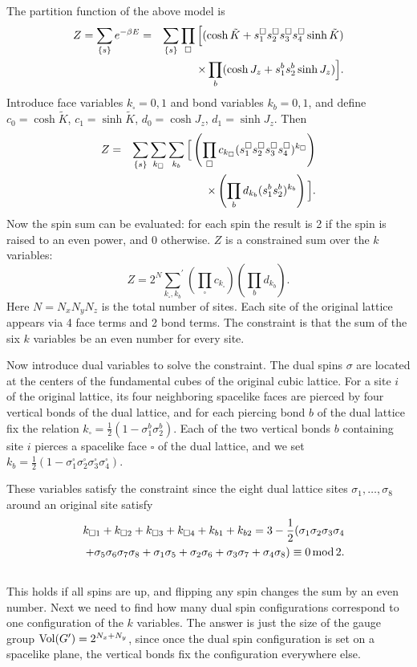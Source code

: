 \documentclass[prl,twocolumn,showpacs,superscriptaddress,preprintnumbers,amssymb]{revtex4}
\def\vol{{\rm Vol}}
\newcommand{\beq}{\begin{equation}}
\newcommand{\eeq}{\end{equation}}
\newcommand{\beqn}{\begin{eqnarray}}
\newcommand{\eeqn}{\end{eqnarray}}
\begin{document}
The partition function of the above model is \beqn Z =
\sum_{\{s\}} e^{-\beta E} &=& \sum_{\{s\}} \prod_\square
\Big[(\cosh {\tilde K} + s^\square_1 s^\square_2 s^\square_3
s^\square_4 \sinh {\tilde K})\cr &&\times \prod_b (\cosh J_z +
s^b_1 s^b_2 \sinh J_z)\Big]. \eeqn Introduce face variables
$k_\square = 0,1$ and bond variables $k_b = 0, 1$, and define $c_0
= \cosh {\tilde K}$, $c_1 = \sinh {\tilde K}$, $d_0 = \cosh J_z$,
$d_1 = \sinh J_z$.  Then
\beqn Z &=& \sum_{\{s\}} \sum_{k_\square}
\sum_{k_b}  \Big[ \left( \prod_{\square}  c_{k_\square}
(s^\square_1 s^\square_2 s^\square_3 s^\square_4)^{k_\square}
\right) \cr && \times \left( \prod_b d_{k_b} (s^b_1
s^b_2)^{k_b}\right)\Big]. \eeqn
Now the spin sum can be evaluated:
for each spin the result is 2 if the spin is raised to an even
power, and 0 otherwise.  $Z$ is a constrained sum over the $k$
variables: \beq Z = 2^N {\sum_{k_\square,k_b}}^\prime \left(
\prod_{\square} c_{k_\square} \right) \left(\prod_b d_{k_b}
\right). \eeq Here $N=N_x N_y N_z$ is the total number of sites.
Each site of the original lattice appears via 4
face terms and 2 bond terms.  The constraint is that the sum of
the six $k$ variables be an even number for every site.

Now introduce dual variables to solve the constraint.  The dual
spins $\sigma$ are located at the centers of the fundamental cubes
of the original cubic lattice.  For a site $i$ of the original
lattice, its four neighboring spacelike faces are pierced by four
vertical bonds of the dual lattice, and for each piercing bond $b$
of the dual lattice fix the relation $k_\square = \frac{1}{2}(1 -
\sigma^b_1 \sigma^b_2)$.  Each of the two vertical bonds $b$
containing site $i$ pierces a spacelike face $\square$ of the dual
lattice, and we set $k_b = \frac{1}{2}(1 - \sigma^\square_1
\sigma^\square_2 \sigma^\square_3 \sigma^\square_4).$

These variables satisfy the constraint since the eight
dual lattice sites $\sigma_1,\ldots,\sigma_8$ around an original site satisfy
\beqn && k_{\square 1} + k_{\square 2}
+ k_{\square 3} + k_{\square 4} + k_{b 1} + k_{b 2} = 3 -
\frac{1}{2}(\sigma_1 \sigma_2 \sigma_3 \sigma_4 \cr&&+ \sigma_5
\sigma_6 \sigma_7 \sigma_8 + \sigma_1 \sigma_5 + \sigma_2 \sigma_6
+ \sigma_3 \sigma_7 + \sigma_4 \sigma_8) \equiv
0\,\rm{mod}\,2.\cr&& \eeqn This holds if all spins are up, and
flipping any spin changes the sum by an even number.  Next we need
to find how many dual spin configurations correspond to one
configuration of the $k$ variables.  The answer is just the size
of the gauge group $\vol(G^\prime) = 2^{N_x + N_y}$, since once
the dual spin configuration is set on a spacelike plane, the
vertical bonds fix the configuration everywhere else.
\end{document}
